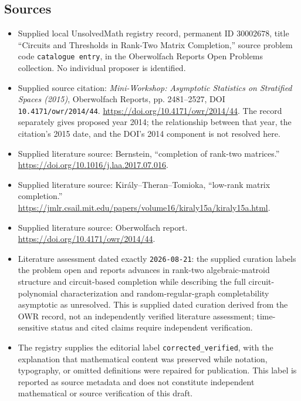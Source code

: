 \documentclass[11pt]{article}
\begin{document}
\subsection{Sources}
\begin{itemize}
\item Supplied local UnsolvedMath registry record, permanent ID \(30002678\), title ``Circuits and Thresholds in Rank-Two Matrix Completion,'' source problem code \texttt{catalogue entry}, in the Oberwolfach Reports Open Problems collection. No individual proposer is identified.
\item Supplied source citation: \emph{Mini-Workshop: Asymptotic Statistics on Stratified Spaces (2015)}, Oberwolfach Reports, pp. 2481--2527, DOI \texttt{10.4171/owr/2014/44}. \url{https://doi.org/10.4171/owr/2014/44}. The record separately gives proposed year 2014; the relationship between that year, the citation's 2015 date, and the DOI's 2014 component is not resolved here.
\item Supplied literature source: Bernstein, ``completion of rank-two matrices.'' \url{https://doi.org/10.1016/j.laa.2017.07.016}.
\item Supplied literature source: Kir\'aly--Theran--Tomioka, ``low-rank matrix completion.'' \url{https://jmlr.csail.mit.edu/papers/volume16/kiraly15a/kiraly15a.html}.
\item Supplied literature source: Oberwolfach report. \url{https://doi.org/10.4171/owr/2014/44}.
\item Literature assessment dated exactly \texttt{2026-08-21}: the supplied curation labels the problem open and reports advances in rank-two algebraic-matroid structure and circuit-based completion while describing the full circuit-polynomial characterization and random-regular-graph completability asymptotic as unresolved. This is supplied dated curation derived from the OWR record, not an independently verified literature assessment; time-sensitive status and cited claims require independent verification.
\item The registry supplies the editorial label \texttt{corrected\_verified}, with the explanation that mathematical content was preserved while notation, typography, or omitted definitions were repaired for publication. This label is reported as source metadata and does not constitute independent mathematical or source verification of this draft.
\end{itemize}
\end{document}
